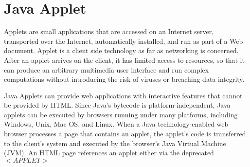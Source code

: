 \section{Java Applet}
Applets are small applications that are accessed on an Internet server, transported over the Internet, automatically installed, and run as part of a Web document. Applet is a client side technology as far  as networking is concerned. After an applet arrives on the client, it has limited access to resources, so that it can produce an arbitrary multimedia user interface and run complex computations without introducing the risk of viruses or breaching data integrity.

Java Applets can provide web applications with interactive features that cannot be provided by HTML. Since Java's bytecode is platform-independent, Java applets can be executed by browsers running under many platforms, including Windows, Unix, Mac OS, and Linux. When a Java technology-enabled web browser processes a page that contains an applet, the applet's code is transferred to the client's system and executed by the browser's Java Virtual Machine (JVM). An HTML page references an applet either via the deprecated $<APPLET>$
